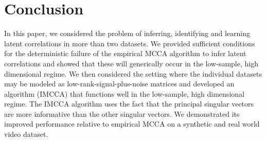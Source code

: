 \section{Conclusion}

In this paper, we considered the problem of inferring, identifying and learning latent
correlations in more than two datasets.  We provided sufficient conditions for
the deterministic failure of the empirical MCCA algorithm to infer latent correlations and
showed that these will generically occur in the low-sample, high dimensional regime. We
then considered the setting where the individual datasets may be modeled as
low-rank-signal-plus-noise matrices and developed an algorithm (IMCCA) that functions well
in the low-sample, high dimensional regime. The IMCCA algorithm uses the fact that the
principal singular vectors are more informative than the other singular vectors. We
demonstrated its improved performance relative to empirical MCCA on a synthetic and real
world video dataset.
